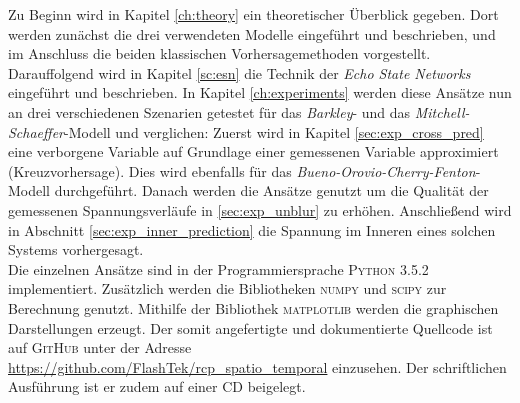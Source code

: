 Zu Beginn wird in Kapitel \ref{ch:theory} ein theoretischer Überblick gegeben. Dort werden zunächst die drei verwendeten Modelle eingeführt und beschrieben, und im Anschluss die beiden klassischen Vorhersagemethoden vorgestellt. Darauffolgend wird in Kapitel \ref{sc:esn} die Technik der \textit{Echo State Networks} eingeführt und beschrieben. In Kapitel \ref{ch:experiments} werden diese Ansätze nun an drei verschiedenen Szenarien getestet für das \textit{Barkley}- und das \textit{Mitchell-Schaeffer}-Modell und verglichen: Zuerst wird in Kapitel \ref{sec:exp_cross_pred} eine verborgene Variable auf Grundlage einer gemessenen Variable approximiert (Kreuzvorhersage). Dies wird ebenfalls für das \textit{Bueno-Orovio-Cherry-Fenton}-Modell durchgeführt. Danach werden die Ansätze genutzt um die Qualität der gemessenen Spannungsverläufe in \ref{sec:exp_unblur} zu erhöhen. Anschließend wird in Abschnitt \ref{sec:exp_inner_prediction} die Spannung im Inneren eines solchen Systems vorhergesagt.\\

Die einzelnen Ansätze sind in der Programmiersprache \textsc{Python 3.5.2} implementiert. Zusätzlich werden die Bibliotheken \textsc{numpy} und \textsc{scipy} zur Berechnung genutzt. Mithilfe der Bibliothek \textsc{matplotlib} werden die graphischen Darstellungen erzeugt. Der somit angefertigte und dokumentierte Quellcode ist auf \textsc{GitHub} unter der Adresse \href{https://github.com/FlashTek/rcp\_spatio\_temporal}{https://github.com/FlashTek/rcp\_spatio\_temporal} einzusehen. Der schriftlichen Ausführung ist er zudem auf einer CD beigelegt.